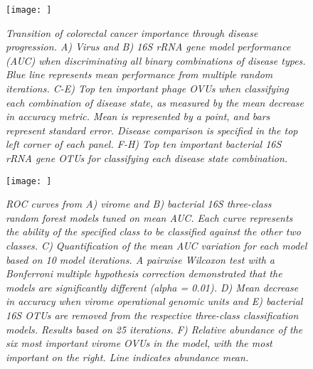 \documentclass[12pt,]{article}
\begin{document}
\newpage

\begin{figure}[htbp]
\centering
\texttt{[image: ]}
\caption{\emph{Transition of colorectal cancer importance through
disease progression. A) Virus and B) 16S rRNA gene model performance
(AUC) when discriminating all binary combinations of disease types. Blue
line represents mean performance from multiple random iterations. C-E)
Top ten important phage OVUs when classifying each combination of
disease state, as measured by the mean decrease in accuracy metric. Mean
is represented by a point, and bars represent standard error. Disease
comparison is specified in the top left corner of each panel. F-H) Top
ten important bacterial 16S rRNA gene OTUs for classifying each disease
state combination.}\label{transitionmodels}}
\end{figure}

\newpage

\begin{figure}[htbp]
\centering
\texttt{[image: ]}
\caption{\emph{ROC curves from A) virome and B) bacterial 16S
three-class random forest models tuned on mean AUC. Each curve
represents the ability of the specified class to be classified against
the other two classes. C) Quantification of the mean AUC variation for
each model based on 10 model iterations. A pairwise Wilcoxon test with a
Bonferroni multiple hypothesis correction demonstrated that the models
are significantly different (alpha = 0.01). D) Mean decrease in accuracy
when virome operational genomic units and E) bacterial 16S OTUs are
removed from the respective three-class classification models. Results
based on 25 iterations. F) Relative abundance of the six most important
virome OVUs in the model, with the most important on the right. Line
indicates abundance mean.}\label{threewaymodel}}
\end{figure}
\end{document}
